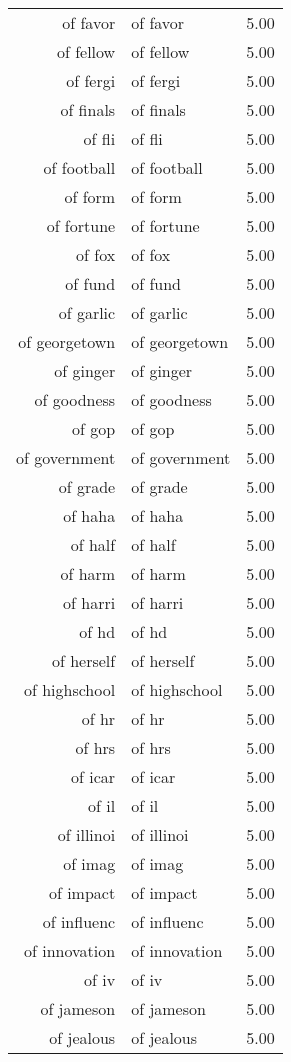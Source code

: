 \begin{table}[ht]
\begin{tabular}{rlr}
  of favor & of favor & 5.00 \\ 
  of fellow & of fellow & 5.00 \\ 
  of fergi & of fergi & 5.00 \\ 
  of finals & of finals & 5.00 \\ 
  of fli & of fli & 5.00 \\ 
  of football & of football & 5.00 \\ 
  of form & of form & 5.00 \\ 
  of fortune & of fortune & 5.00 \\ 
  of fox & of fox & 5.00 \\ 
  of fund & of fund & 5.00 \\ 
  of garlic & of garlic & 5.00 \\ 
  of georgetown & of georgetown & 5.00 \\ 
  of ginger & of ginger & 5.00 \\ 
  of goodness & of goodness & 5.00 \\ 
  of gop & of gop & 5.00 \\ 
  of government & of government & 5.00 \\ 
  of grade & of grade & 5.00 \\ 
  of haha & of haha & 5.00 \\ 
  of half & of half & 5.00 \\ 
  of harm & of harm & 5.00 \\ 
  of harri & of harri & 5.00 \\ 
  of hd & of hd & 5.00 \\ 
  of herself & of herself & 5.00 \\ 
  of highschool & of highschool & 5.00 \\ 
  of hr & of hr & 5.00 \\ 
  of hrs & of hrs & 5.00 \\ 
  of icar & of icar & 5.00 \\ 
  of il & of il & 5.00 \\ 
  of illinoi & of illinoi & 5.00 \\ 
  of imag & of imag & 5.00 \\ 
  of impact & of impact & 5.00 \\ 
  of influenc & of influenc & 5.00 \\ 
  of innovation & of innovation & 5.00 \\ 
  of iv & of iv & 5.00 \\ 
  of jameson & of jameson & 5.00 \\ 
  of jealous & of jealous & 5.00 \\ 

\end{tabular}
\end{table}
